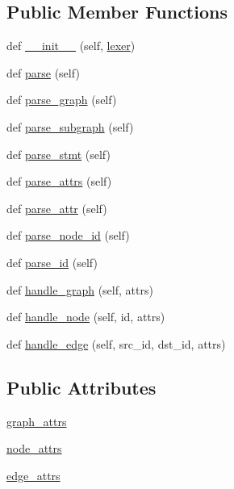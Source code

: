 \subsection*{Public Member Functions}
\begin{DoxyCompactItemize}
\item 
def \hyperlink{classsmacc__viewer_1_1xdot_1_1xdot_1_1DotParser_ab901727aaabb5ca8f3d54c3b8d66c580}{\+\_\+\+\_\+init\+\_\+\+\_\+} (self, \hyperlink{classsmacc__viewer_1_1xdot_1_1xdot_1_1Parser_a62d14956c8f00404c642ce01c290c3d1}{lexer})
\item 
def \hyperlink{classsmacc__viewer_1_1xdot_1_1xdot_1_1DotParser_aefcefe7bc455f4fc86f366a0b36c8efb}{parse} (self)
\item 
def \hyperlink{classsmacc__viewer_1_1xdot_1_1xdot_1_1DotParser_ad807f583875318fe8d5c2304360459ef}{parse\+\_\+graph} (self)
\item 
def \hyperlink{classsmacc__viewer_1_1xdot_1_1xdot_1_1DotParser_aa0071f6f1c4280c56a30bb7613e2746d}{parse\+\_\+subgraph} (self)
\item 
def \hyperlink{classsmacc__viewer_1_1xdot_1_1xdot_1_1DotParser_ab0abf8209a36d81e162b0dc2a0b94d54}{parse\+\_\+stmt} (self)
\item 
def \hyperlink{classsmacc__viewer_1_1xdot_1_1xdot_1_1DotParser_a4c4e5481923aea34020af094cea6a961}{parse\+\_\+attrs} (self)
\item 
def \hyperlink{classsmacc__viewer_1_1xdot_1_1xdot_1_1DotParser_afedd198fd7d76e36e655416c11772189}{parse\+\_\+attr} (self)
\item 
def \hyperlink{classsmacc__viewer_1_1xdot_1_1xdot_1_1DotParser_a1e6a31b7158808bf1c67efc3b4899977}{parse\+\_\+node\+\_\+id} (self)
\item 
def \hyperlink{classsmacc__viewer_1_1xdot_1_1xdot_1_1DotParser_aec7bb154831d9a665fbd1a6b609dc340}{parse\+\_\+id} (self)
\item 
def \hyperlink{classsmacc__viewer_1_1xdot_1_1xdot_1_1DotParser_aa0697f725bb9ce0f90738bf0048bcb7c}{handle\+\_\+graph} (self, attrs)
\item 
def \hyperlink{classsmacc__viewer_1_1xdot_1_1xdot_1_1DotParser_ac7bf39b9aad44e2aa5770441c5dbb399}{handle\+\_\+node} (self, id, attrs)
\item 
def \hyperlink{classsmacc__viewer_1_1xdot_1_1xdot_1_1DotParser_a1eb4713f9573be1383426eb7cc8b944d}{handle\+\_\+edge} (self, src\+\_\+id, dst\+\_\+id, attrs)
\end{DoxyCompactItemize}
\subsection*{Public Attributes}
\begin{DoxyCompactItemize}
\item 
\hyperlink{classsmacc__viewer_1_1xdot_1_1xdot_1_1DotParser_a3b9334f4df11771fb8623add522ebe00}{graph\+\_\+attrs}
\item 
\hyperlink{classsmacc__viewer_1_1xdot_1_1xdot_1_1DotParser_af0ebb95c9f287e9d0d6c57b1c29bd46b}{node\+\_\+attrs}
\item 
\hyperlink{classsmacc__viewer_1_1xdot_1_1xdot_1_1DotParser_a9a5788523c2c34ecb8d3fab1135ee272}{edge\+\_\+attrs}
\end{DoxyCompactItemize}


